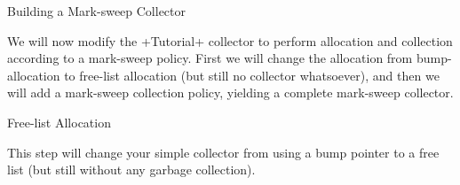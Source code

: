 \begin{chapter}{Building a Mark-sweep Collector}
\label{cha:buildingamarksweepcollector}

We will now modify the \spverb+Tutorial+ collector to perform allocation and collection according to a mark-sweep policy. First we will change the allocation from bump-allocation to free-list allocation (but still no collector whatsoever), and then we will add a mark-sweep collection policy, yielding a complete mark-sweep collector.

\begin{section}{Free-list Allocation}

This step will change your simple collector from using a bump pointer to a free list (but still without any garbage collection).


\end{section}
\end{chapter}
